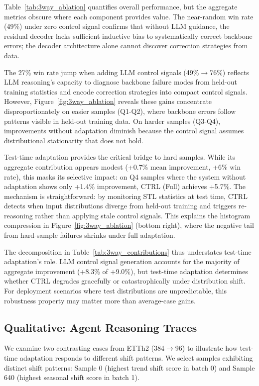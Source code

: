 Table~\ref{tab:3way_ablation} quantifies overall performance, but the aggregate metrics obscure where each component provides value. The near-random win rate (49\%) under zero control signal confirms that without LLM guidance, the residual decoder lacks sufficient inductive bias to systematically correct backbone errors; the decoder architecture alone cannot discover correction strategies from data.

The 27\% win rate jump when adding LLM control signals (49\%$\to$76\%) reflects LLM reasoning's capacity to diagnose backbone failure modes from held-out training statistics and encode correction strategies into compact control signals. However, Figure~\ref{fig:3way_ablation} reveals these gains concentrate disproportionately on easier samples (Q1-Q2), where backbone errors follow patterns visible in held-out training data. On harder samples (Q3-Q4), improvements without adaptation diminish because the control signal assumes distributional stationarity that does not hold.

Test-time adaptation provides the critical bridge to hard samples. While its aggregate contribution appears modest (+0.7\% mean improvement, +6\% win rate), this masks its selective impact: on Q4 samples where the system without adaptation shows only +1.4\% improvement, CTRL (Full) achieves +5.7\%. The mechanism is straightforward: by monitoring STL statistics at test time, CTRL detects when input distributions diverge from held-out training and triggers re-reasoning rather than applying stale control signals. This explains the histogram compression in Figure~\ref{fig:3way_ablation} (bottom right), where the negative tail from hard-sample failures shrinks under full adaptation.

The decomposition in Table~\ref{tab:3way_contributions} thus understates test-time adaptation's role. LLM control signal generation accounts for the majority of aggregate improvement (+8.3\% of +9.0\%), but test-time adaptation determines whether CTRL degrades gracefully or catastrophically under distribution shift. For deployment scenarios where test distributions are unpredictable, this robustness property may matter more than average-case gains.

\subsection{Qualitative: Agent Reasoning Traces}

We examine two contrasting cases from ETTh2 (384$\rightarrow$96) to illustrate how test-time adaptation responds to different shift patterns. We select samples exhibiting distinct shift patterns: Sample 0 (highest trend shift score in batch 0) and Sample 640 (highest seasonal shift score in batch 1).

